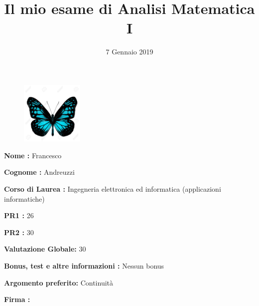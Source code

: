 \documentclass[11pt, oneside]{article}   	%
\title{\bf Il mio esame di Analisi Matematica I}
\author{}
\date{7 Gennaio 2019}							%
\begin{document}
\maketitle
\begin{figure}[ht!]
\centering
\includegraphics[width=30mm]{papi.jpg}
\end{figure}
\thispagestyle{empty}

{\bf Nome :} Francesco

\bigskip
{\bf Cognome :} Andreuzzi

\bigskip
{\bf Corso di Laurea :} Ingegneria elettronica ed informatica (applicazioni informatiche)


\bigskip

 \bigskip
{\bf PR1 :} 26

\bigskip
{\bf PR2 :} 30


\bigskip
{\bf Valutazione Globale:} 30

\bigskip
\bigskip
{\bf Bonus, test e altre informazioni :} Nessun bonus


\bigskip
\bigskip
\bigskip
{\bf Argomento preferito:} Continuità

\bigskip
\bigskip
\bigskip

\bigskip
{\bf Firma :}
\end{document}

